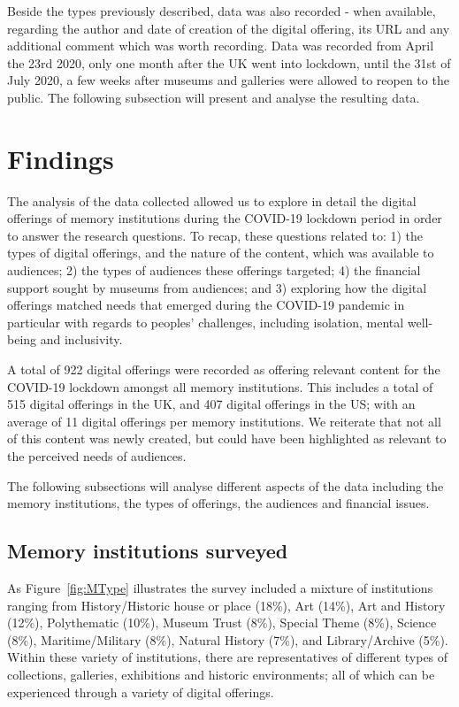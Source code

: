 \documentclass{egpubl}
\begin{document}
Beside the types previously described, data was also recorded - when available, regarding the author and date of creation of the digital offering, its URL and any additional comment which was worth recording. Data was recorded from April the 23rd 2020, only one month after the UK went into lockdown, until the 31st of July 2020, a few weeks after museums and galleries were allowed to reopen to the public. The following subsection will present and analyse the resulting data. 


\section{Findings}
The analysis of the data collected allowed us to explore in detail the digital offerings of memory institutions during the COVID-19 lockdown period in order to answer the research questions. To recap, these questions related to: 1) the types of digital offerings, and the nature of the content, which was available to audiences; 2) the types of audiences these offerings targeted; 4) the financial support sought by museums from audiences; and 3) exploring how the digital offerings matched needs that emerged during the COVID-19 pandemic in particular with regards to peoples’ challenges, including isolation, mental well-being and inclusivity. 

A total of 922 digital offerings were recorded as offering relevant content for the COVID-19 lockdown amongst all memory institutions. This includes a total of 515 digital offerings in the UK, and 407 digital offerings in the US; with an average of 11 digital offerings per memory institutions. We reiterate that not all of this content was newly created, but could have been highlighted as relevant to the perceived needs of audiences. 


The following subsections will analyse different aspects of the data including the memory institutions, the types of offerings, the audiences and financial issues.

\subsection{Memory institutions surveyed}
As Figure~\ref{fig:MType} illustrates the survey included a mixture of institutions ranging from History/Historic house or place (18\%), Art (14\%), Art and History (12\%), Polythematic (10\%), Museum Trust (8\%), Special Theme (8\%), Science (8\%), Maritime/Military (8\%), Natural History (7\%), and Library/Archive (5\%). Within these variety of institutions, there are representatives of different types of collections, galleries, exhibitions and historic environments; all of which can be experienced through a variety of digital offerings. 
\end{document}
